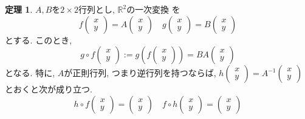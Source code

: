 \documentclass[dvipdfmx,a4paper,11pt]{article}
\newcommand{\R}{\mathbb{R}}
\theoremstyle{definition}
\newtheorem{thm}{定理}
\begin{document}
 
 \begin{tcolorbox}[
    colback = white,
    colframe = green!35!black,
    fonttitle = \bfseries,
    breakable = true]
    \begin{thm}
$A,B$を$2 \times 2$行列とし, $\R^2$の一次変換
を    
  $$
f\begin{pmatrix}
x \\ y
 \end{pmatrix} 
 =
 A
\begin{pmatrix}
x \\ y
 \end{pmatrix}  
\quad
g\begin{pmatrix}
x \\ y
 \end{pmatrix} 
 =
 B
\begin{pmatrix}
x \\ y
 \end{pmatrix}  
$$
 とする. 
 このとき, 
 $$
 g\circ f 
 \begin{pmatrix}
x \\ y
 \end{pmatrix}  
 := g \left( 
 f\begin{pmatrix}
x \\ y
 \end{pmatrix} 
 \right)
 =BA \begin{pmatrix}
x \\ y
 \end{pmatrix} 
 $$
 となる. 
特に, $A$が正則行列, つまり逆行列を持つならば, 
$
h\begin{pmatrix}
x \\ y
 \end{pmatrix} 
 =
 A^{-1}
\begin{pmatrix}
x \\ y
 \end{pmatrix}  
 $
 とおくと次が成り立つ.
 $$
  h\circ f 
 \begin{pmatrix}
x \\ y
 \end{pmatrix}  
 =
  \begin{pmatrix}
x \\ y
 \end{pmatrix}  
 \quad 
  f\circ h 
 \begin{pmatrix}
x \\ y
 \end{pmatrix}  
 =
  \begin{pmatrix}
x \\ y
 \end{pmatrix}  
 $$
\end{thm}
 \end{tcolorbox}
 
\end{document}
